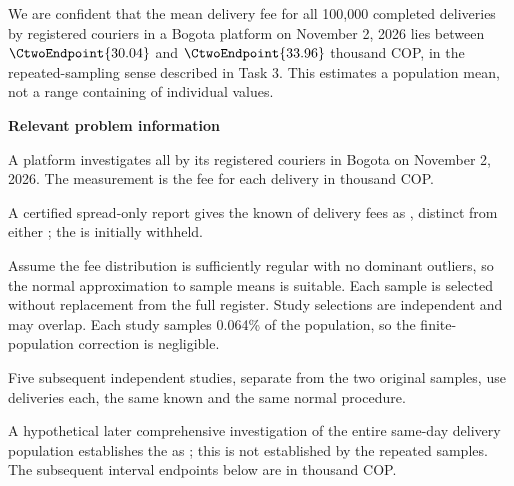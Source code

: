 We are  confident that the mean delivery fee for all 100,000 completed deliveries by registered couriers in a Bogota platform on November 2, 2026 lies between $\CtwoEndpoint{30.04}$ and $\CtwoEndpoint{33.96}$ thousand COP, in the repeated-sampling sense described in Task 3. This estimates a population mean, not a range containing  of individual values.

\secInicio[][sec:p3]

\clearpage



\textbf{Relevant problem information}

\begin{probleminfoexcerpt}
A platform investigates all    by its registered couriers in Bogota on November 2, 2026. The measurement is the fee for each delivery in thousand COP.
\end{probleminfoexcerpt}

\begin{probleminfoexcerpt}
A certified spread-only report gives the known    of delivery fees as   , distinct from either   ; the   is initially withheld.
\end{probleminfoexcerpt}

\begin{probleminfoexcerpt}
Assume the fee distribution is sufficiently regular with no dominant outliers, so the normal approximation to sample means is suitable. Each sample is selected without replacement from the full register. Study selections are independent and may overlap. Each study samples 0.064\% of the population, so the finite-population correction is negligible.
\end{probleminfoexcerpt}

\begin{probleminfoexcerpt}
Five subsequent independent studies, separate from the two original samples, use  deliveries each, the same known    and the same  normal procedure.
\end{probleminfoexcerpt}

\begin{probleminfoexcerpt}
A hypothetical later comprehensive investigation of the entire same-day delivery population establishes the   as   ; this is not established by the repeated samples. The subsequent interval endpoints below are in thousand COP.
\end{probleminfoexcerpt}

